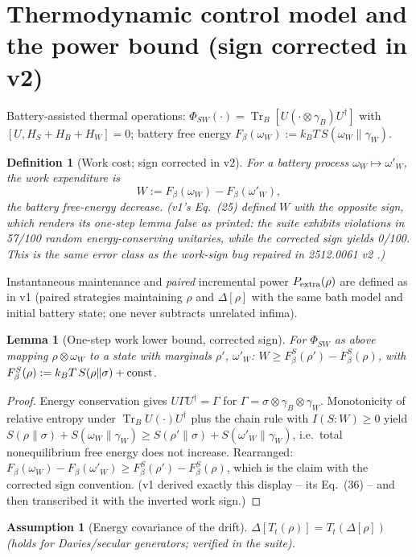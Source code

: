 \documentclass[11pt]{article}
\newtheorem{lemma}[theorem]{Lemma}
\newtheorem{definition}[theorem]{Definition}
\newtheorem{assumption}[theorem]{Assumption}
\theoremstyle{remark}
\newcommand{\Tr}{\operatorname{Tr}}
\begin{document}
\section{Thermodynamic control model and the power bound (sign corrected
in v2)}
Battery-assisted thermal operations: $\Phi_{SW}(\cdot) = \Tr_B[U(\cdot
\otimes \gamma_B)U^\dagger]$ with $[U, H_S + H_B + H_W] = 0$; battery
free energy $F_\beta(\omega_W) := k_B T\, S(\omega_W\|\gamma_W)$.
\begin{definition}[Work cost; sign corrected in v2]
\label{def:work}
For a battery process $\omega_W \mapsto \omega'_W$, the work
\emph{expenditure} is
\[
W := F_\beta(\omega_W) - F_\beta(\omega'_W),
\]
the battery free-energy \emph{decrease}. (v1's Eq.~(25) defined $W$ with
the opposite sign, which renders its one-step lemma false as printed: the
suite exhibits violations in 57/100 random energy-conserving unitaries,
while the corrected sign yields 0/100. This is the same error class as the
work-sign bug repaired in 2512.0061 v2 \cite{S0061}.)
\end{definition}
Instantaneous maintenance and \emph{paired} incremental power
$P_{\rm extra}(\rho)$ are defined as in v1 (paired strategies maintaining
$\rho$ and $\Delta[\rho]$ with the same bath model and initial battery
state; one never subtracts unrelated infima).
\begin{lemma}[One-step work lower bound, corrected sign]
\label{lem:work}
For $\Phi_{SW}$ as above mapping $\rho \otimes \omega_W$ to a state with
marginals $\rho'$, $\omega'_W$:
$W \ge F^S_\beta(\rho') - F^S_\beta(\rho)$, with $F^S_\beta(\rho) := k_B T
\, S(\rho\|\sigma) + {\rm const}$.
\end{lemma}
\begin{proof}
Energy conservation gives $U\Gamma U^\dagger = \Gamma$ for $\Gamma =
\sigma \otimes \gamma_B \otimes \gamma_W$. Monotonicity of relative
entropy under $\Tr_B U(\cdot)U^\dagger$ plus the chain rule with
$I(S{:}W) \ge 0$ yield
$S(\rho\|\sigma) + S(\omega_W\|\gamma_W) \ge S(\rho'\|\sigma) +
S(\omega'_W\|\gamma_W)$, i.e.\ total nonequilibrium free energy does not
increase. Rearranged: $F_\beta(\omega_W) - F_\beta(\omega'_W) \ge
F^S_\beta(\rho') - F^S_\beta(\rho)$, which is the claim with the corrected
sign convention. (v1 derived exactly this display -- its Eq.~(36) -- and
then transcribed it with the inverted work sign.)
\end{proof}
\begin{assumption}[Energy covariance of the drift]
\label{ass:cov}
$\Delta[T_t(\rho)] = T_t(\Delta[\rho])$ (holds for Davies/secular
generators; verified in the suite).
\end{assumption}
\end{document}
